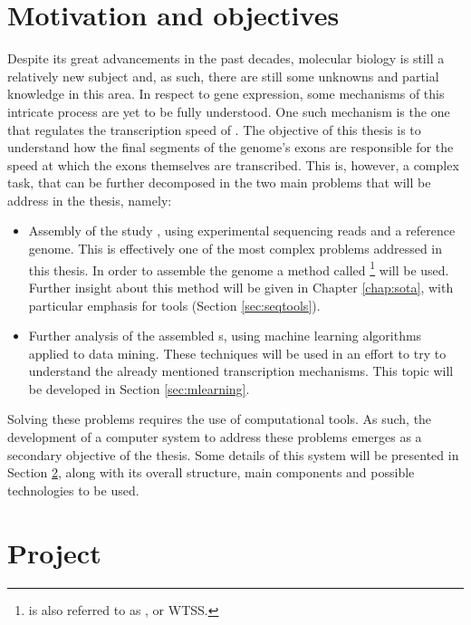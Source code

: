 \section{Motivation and objectives} \label{sec:motivation}

Despite its great advancements in the past decades, molecular biology is still a
relatively new subject and, as such, there are still some unknowns and partial
knowledge in this area. In respect to gene expression, some mechanisms of this
intricate process are yet to be fully understood. One such mechanism is the one
that regulates the transcription speed of \rna. The objective of this thesis is
to understand how the final segments of the genome's exons are responsible for
the speed at which the exons themselves are transcribed. This is, however, a
complex task, that can be further decomposed in the two main problems that will
be address in the thesis, namely:

\begin{itemize}

  \item
  Assembly of the study \trans, using experimental sequencing reads and a
  reference genome. This is effectively one of the most complex problems
  addressed in this thesis. In order to assemble the genome a method called
  \rnaseq{}\footnote{\rnaseq{} is also referred to as , or WTSS.} will be used. Further insight about this method will be
  given in Chapter \ref{chap:sota}, with particular emphasis for \rnaseq{} tools
  (Section \ref{sec:seqtools}).

  \item
  Further analysis of the assembled \trans s, using machine learning algorithms
  applied to data mining. These techniques will be used in an effort to try to
  understand the already mentioned transcription mechanisms. This topic will be
  developed in Section \ref{sec:mlearning}.

\end{itemize}

Solving these problems requires the use of computational tools. As such, the
development of a computer system to address these problems emerges as a
secondary objective of the thesis. Some details of this system will be presented
in Section \ref{sec:project}, along with its overall structure, main components
and possible technologies to be used.

\section{Project} \label{sec:project}

